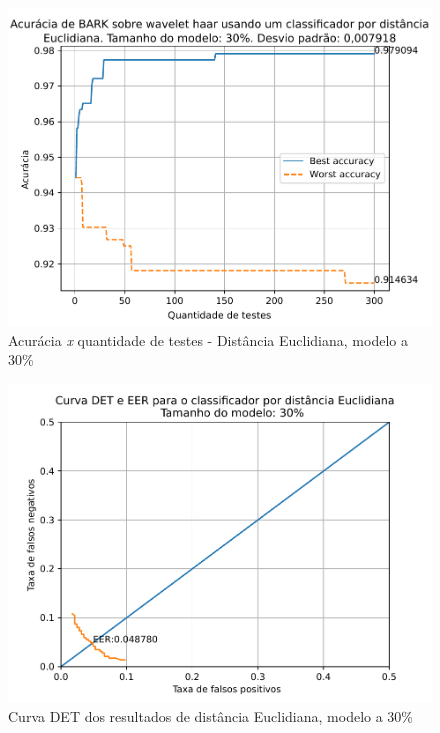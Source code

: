 			\begin{figure}[H]
				\centering
				\includegraphics[width=.9\linewidth]{images/results/confusionMatrices/classifier_Euclidian_30}
				\caption{Acurácia \textit{x} quantidade de testes - Distância Euclidiana, modelo a 30\%}
				\label{fig:classifiereuclidian30}
			\end{figure}
		
			\begin{figure}[H]
				\centering
				\includegraphics[width=.9\linewidth]{images/results/det/DET_for_classifier_Euclidian_30}
				\caption{Curva DET dos resultados de distância Euclidiana, modelo a 30\%}
				\label{fig:detforclassifiereuclidian30}
			\end{figure}
			
